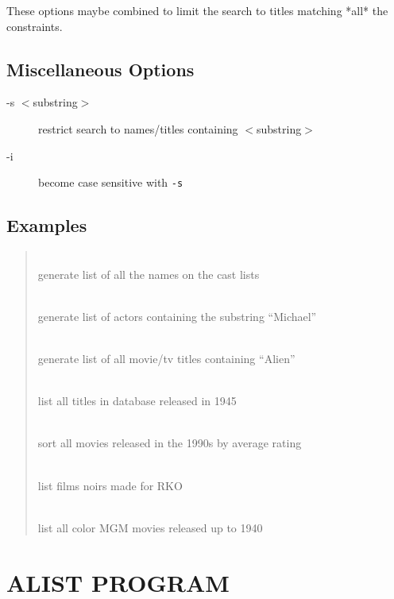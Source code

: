 These options maybe combined to limit the search to titles matching *all*
the constraints.

\subsection{Miscellaneous Options}

\begin{description}
\item[-s $<$substring$>$]  restrict search to names/titles containing 
$<$substring$>$
\item[-i]  become case sensitive with {\tt -s}
\end{description}

\subsection{Examples}

\begin{quotation}
\\
   generate list of all the names on the cast lists
   
\\
   generate list of actors containing the substring ``Michael''
  
\\
   generate list of all movie/tv titles containing ``Alien'' 
  
\\
   list all titles in database released in 1945
  
\\
   sort all movies released in the 1990s by average rating

\\
   list films noirs made for RKO

\\
   list all color MGM movies released up to 1940
\end{quotation}

\clearpage
\section{\label{alist}ALIST PROGRAM}

